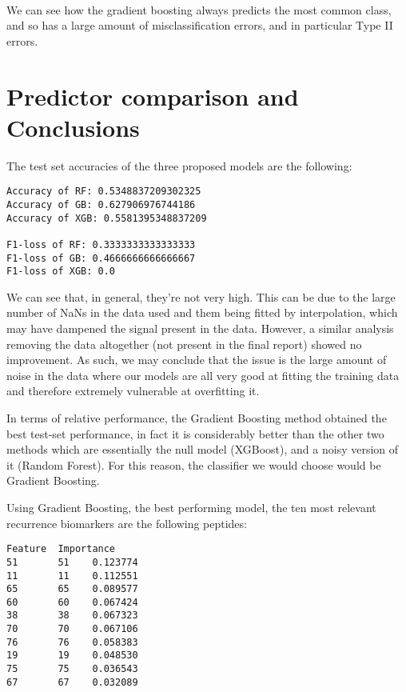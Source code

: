 \documentclass[11pt]{article}
\begin{document}
    \begin{center}
    \end{center}
    { \hspace*{\fill} \\}
    
    We can see how the gradient boosting always predicts the most common
class, and so has a large amount of misclassification errors, and in particular Type II errors.

    \hypertarget{predictor-comparison-and-conclusions}{%
\section{Predictor comparison and
Conclusions}\label{predictor-comparison-and-conclusions}}

    The test set accuracies of the three proposed models are the following:


    \begin{Verbatim}[commandchars=\\\{\}]
Accuracy of RF: 0.5348837209302325
Accuracy of GB: 0.627906976744186
Accuracy of XGB: 0.5581395348837209

F1-loss of RF: 0.3333333333333333
F1-loss of GB: 0.4666666666666667
F1-loss of XGB: 0.0
    \end{Verbatim}

    We can see that, in general, they're not very high. This can be due to
the large number of NaNs in the data used and them being fitted by
interpolation, which may have dampened the signal present in the data.
However, a similar analysis removing the data altogether (not present in
the final report) showed no improvement. As such, we may conclude that
the issue is the large amount of noise in the data where our models are
all very good at fitting the training data and therefore extremely
vulnerable at overfitting it.

In terms of relative performance, the Gradient Boosting method obtained
the best test-set performance, in fact it is considerably better than
the other two methods which are essentially the null model (XGBoost),
and a noisy version of it (Random Forest). For this reason, the
classifier we would choose would be Gradient Boosting.

    Using Gradient Boosting, the best performing model, the ten most
relevant recurrence biomarkers are the following peptides:


    \begin{Verbatim}[commandchars=\\\{\}]
    Feature  Importance
51       51    0.123774
11       11    0.112551
65       65    0.089577
60       60    0.067424
38       38    0.067323
70       70    0.067106
76       76    0.058383
19       19    0.048530
75       75    0.036543
67       67    0.032089
    \end{Verbatim}
\end{document}
